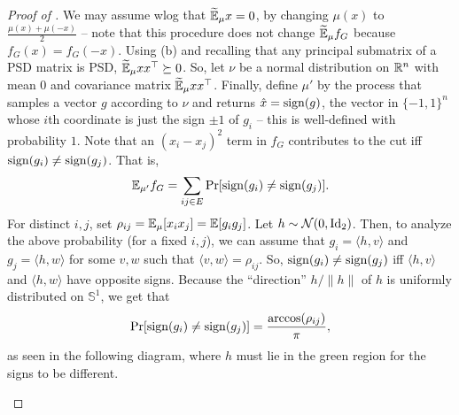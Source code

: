 	\begin{proof}[Proof of ]
		We may assume wlog that $\widetilde{\mathbb{E}}_\mu x = 0$, by changing $\mu(x)$ to $\frac{\mu(x) + \mu(-x)}{2}$ -- note that this procedure does not change $\widetilde{\mathbb{E}}_\mu f_G$ because $f_G(x) = f_G(-x)$. Using (b) and recalling that any principal submatrix of a PSD matrix is PSD, $\widetilde{\mathbb{E}}_\mu xx^\top \succeq 0$. So, let $\nu$ be a normal distribution on $\mathbb{R}^n$ with mean $0$ and covariance matrix $\widetilde{\mathbb{E}}_\mu xx^\top$. Finally, define $\mu'$ by the process that samples a vector $g$ according to $\nu$ and returns $\hat{x} = \operatorname{sign}(g)$, the vector in $\{-1,1\}^n$ whose $i$th coordinate is just the sign $\pm 1$ of $g_i$ -- this is well-defined with probability $1$. Note that an $(x_i - x_j)^2$ term in $f_G$ contributes to the cut iff $\operatorname{sign}(g_i) \ne \operatorname{sign}(g_j)$. That is,
		\[ \mathbb{E}_{\mu'} f_G = \sum_{ij \in E} \Pr[\operatorname{sign}(g_i) \ne \operatorname{sign}(g_j)]. \]
		For distinct $i,j$, set $\rho_{ij} = \mathbb{E}_{\mu}[x_i x_j] = \mathbb{E} [g_i g_j]$. Let $h \sim \mathcal{N}(0,\operatorname{Id}_2)$. Then, to analyze the above probability (for a fixed $i,j$), we can assume that $g_i = \langle h,v\rangle$ and $g_j = \langle h,w\rangle$ for some $v,w$ such that $\langle v,w\rangle = \rho_{ij}$. So, $\operatorname{sign}(g_i) \ne \operatorname{sign}(g_j)$ iff $\langle h,v\rangle$ and $\langle h,w\rangle$ have opposite signs. Because the ``direction'' $h/\|h\|$ of $h$ is uniformly distributed on $\mathbb{S}^1$, we get that
		\[ \Pr[\operatorname{sign}(g_i) \ne \operatorname{sign}(g_j)] = \frac{\arccos(\rho_{ij})}{\pi}, \]
		as seen in the following diagram, where $h$ must lie in the green region for the signs to be different.

		\begin{center}


\end{center}
\end{proof}

